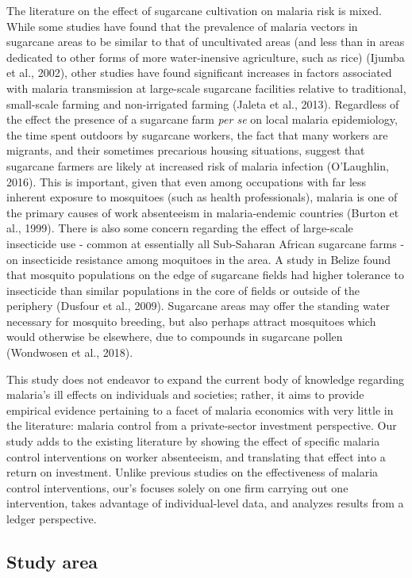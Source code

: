 \documentclass[]{article}
\begin{document}
The literature on the effect of sugarcane cultivation on malaria risk is
mixed. While some studies have found that the prevalence of malaria
vectors in sugarcane areas to be similar to that of uncultivated areas
(and less than in areas dedicated to other forms of more water-inensive
agriculture, such as rice) (Ijumba et al., 2002), other studies have
found significant increases in factors associated with malaria
transmission at large-scale sugarcane facilities relative to
traditional, small-scale farming and non-irrigated farming (Jaleta et
al., 2013). Regardless of the effect the presence of a sugarcane farm
\emph{per se} on local malaria epidemiology, the time spent outdoors by
sugarcane workers, the fact that many workers are migrants, and their
sometimes precarious housing situations, suggest that sugarcane farmers
are likely at increased risk of malaria infection (O'Laughlin, 2016).
This is important, given that even among occupations with far less
inherent exposure to mosquitoes (such as health professionals), malaria
is one of the primary causes of work absenteeism in malaria-endemic
countries (Burton et al., 1999). There is also some concern regarding
the effect of large-scale insecticide use - common at essentially all
Sub-Saharan African sugarcane farms - on insecticide resistance among
moquitoes in the area. A study in Belize found that mosquito populations
on the edge of sugarcane fields had higher tolerance to insecticide than
similar populations in the core of fields or outside of the periphery
(Dusfour et al., 2009). Sugarcane areas may offer the standing water
necessary for mosquito breeding, but also perhaps attract mosquitoes
which would otherwise be elsewhere, due to compounds in sugarcane pollen
(Wondwosen et al., 2018).

This study does not endeavor to expand the current body of knowledge
regarding malaria's ill effects on individuals and societies; rather, it
aims to provide empirical evidence pertaining to a facet of malaria
economics with very little in the literature: malaria control from a
private-sector investment perspective. Our study adds to the existing
literature by showing the effect of specific malaria control
interventions on worker absenteeism, and translating that effect into a
return on investment. Unlike previous studies on the effectiveness of
malaria control interventions, our's focuses solely on one firm carrying
out one intervention, takes advantage of individual-level data, and
analyzes results from a ledger perspective.

\subsection{Study area}\label{study-area}
\end{document}
